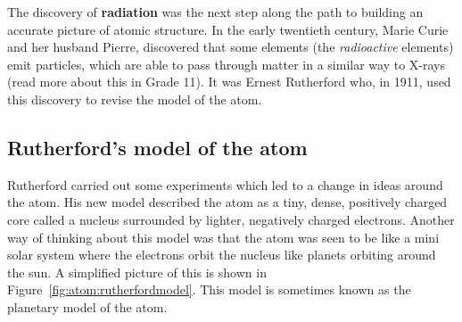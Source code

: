         \label{m38756*id254642}The discovery of \textbf{radiation} was the next step along the path to building an accurate picture of atomic structure. In the early twentieth century, Marie Curie and her husband Pierre,  discovered that some elements (the \textsl{radioactive} elements) emit particles, which are able to pass through matter in a similar way to X-rays (read more about this in Grade 11). It was Ernest Rutherford who, in 1911, used this discovery to revise the model of the atom.\par 
      \label{m38756*eip-956}
      \label{m38756*uid3}
            \subsection*{Rutherford's model of the atom}
            \nopagebreak
\begin{minipage}{.5\textwidth}
            \label{m38756*id254751}Rutherford carried out some experiments which led to a change in ideas around the atom. His new model described the atom as a tiny, dense, positively charged core called a nucleus surrounded by lighter, negatively charged electrons. Another way of thinking about this model was that the atom was seen to be like a mini solar system where the electrons orbit the nucleus like planets orbiting around the sun. A simplified picture of this is shown in Figure~\ref{fig:atom:rutherfordmodel}. This model is sometimes known as the planetary model of the atom.\par 
\end{minipage}
